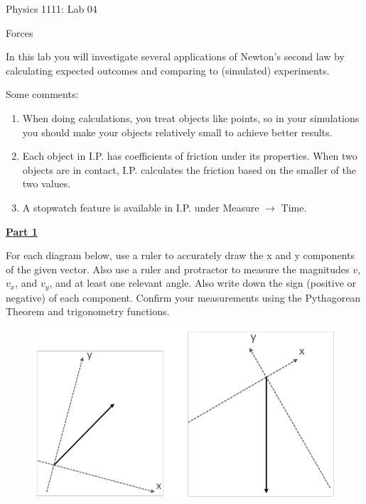 \documentclass[12pt]{article}
\begin{document}
{\centering
\large Physics 1111: Lab 04 \par
\large Forces \par
}
\hfill \break \vspace{-4mm}

In this lab you will investigate several applications of Newton's second law by calculating expected outcomes and comparing to (simulated) experiments.

Some comments:
\begin{enumerate}
\item When doing calculations, you treat objects like points, so in your simulations you should make your objects relatively small to achieve better results.
\item Each object in I.P. has coefficients of friction under its properties. When two objects are in contact, I.P. calculates the friction based on the smaller of the two values.
\item A stopwatch feature is available in I.P. under Measure $\rightarrow$ Time.
\end{enumerate}

\underline{\textbf{Part 1}} \par
For each diagram below, use a ruler to accurately draw the x and y components of the given vector.
Also use a ruler and protractor to measure the magnitudes $v$, $v_x$, and $v_y$, and at least one relevant angle.
Also write down the sign (positive or negative) of each component.
Confirm your measurements using the Pythagorean Theorem and trigonometry functions.
%
\begin{figure}[H]
\includegraphics[scale=0.70]{figures/fig1.png}
\end{figure}
\end{document}
